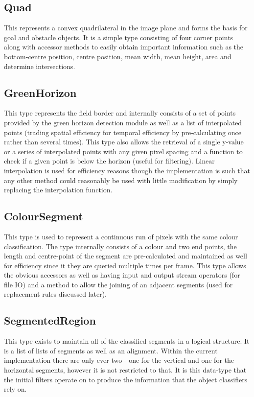 \documentclass[]{report}
\begin{document}
\subsection{Quad}
This represents a convex quadrilateral in the image plane and forms the basis for goal and obstacle objects. It is a simple type consisting of four corner points along with accessor methods to easily obtain important information such as the bottom-centre position, centre position, mean width, mean height, area and determine intersections.
\subsection{GreenHorizon}
This type represents the field border and internally consists of a set of points provided by the green horizon detection module as well as a list of interpolated points (trading spatial efficiency for temporal efficiency by pre-calculating once rather than several times). This type also allows the retrieval of a single y-value or a series of interpolated points with any given pixel spacing and a function to check if a given point is below the horizon (useful for filtering). Linear interpolation is used for efficiency reasons though the implementation is such that any other method could reasonably be used with little modification by simply replacing the interpolation function.
\subsection{ColourSegment}
This type is used to represent a continuous run of pixels with the same colour classification. The type internally consists of a colour and two end points, the length and centre-point of the segment are pre-calculated and maintained as well for efficiency since it they are queried multiple times per frame. This type allows the obvious accessors as well as having input and output stream operators (for file IO) and a method to allow the joining of an adjacent segments (used for replacement rules discussed later).
\subsection{SegmentedRegion}
This type exists to maintain all of the classified segments in a logical structure. It is a list of lists of segments as well as an alignment. Within the current implementation there are only ever two - one for the vertical and one for the horizontal segments, however it is not restricted to that. It is this data-type that the initial filters operate on to produce the information that the object classifiers rely on.
\end{document}

